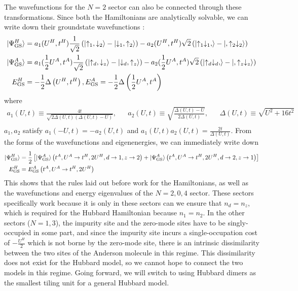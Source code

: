 \documentclass{article}
\numberwithin{equation}{section}
\begin{document}
The wavefunctions for the \(N=2\) sector can also be connected through these transformations. Since both the Hamiltonians are analytically solvable, we can write down their groundstate wavefunctions \cite{pavarini}:
\begin{equation}\begin{aligned}
	\ket{\Psi^H_\text{GS}} &= a_1(U^H, t^H)\frac{1}{\sqrt 2}\left(\ket{\uparrow_1, \downarrow_2} - \ket{\downarrow_1, \uparrow_2}\right) - a_2(U^H,t^H){\sqrt 2}\left(\ket{\uparrow_1\downarrow_1, } - \ket{,\uparrow_2\downarrow_2}\right)\\
	\ket{\Psi^A_\text{GS}} &= a_1(\frac{1}{2}U^A, t^A)\frac{1}{\sqrt 2}\left(\ket{\uparrow_d, \downarrow_z} - \ket{\downarrow_d, \uparrow_z}\right) - a_2(\frac{1}{2}U^A,t^A){\sqrt 2}\left(\ket{\uparrow_d\downarrow_d, } - \ket{,\uparrow_z\downarrow_z}\right)\\
	E^H_\text{GS} &=  -\frac{1}{2}\Delta\left( U^H, t^H \right), E^A_\text{GS} =  -\frac{1}{2}\Delta\left( \frac{1}{2}U^A, t^A \right)
\end{aligned}\end{equation}
where 
\begin{equation}\begin{aligned}
	a_1(U,t) \equiv \frac{4t}{\sqrt{2\Delta(U,t)\left( \Delta(U,t) - U \right) }}, && a_2(U,t) \equiv \sqrt{\frac{\Delta(U,t) - U}{2\Delta(U,t)}}, &&\Delta(U,t) \equiv \sqrt{U^2 + 16t^2}\\
\end{aligned}\end{equation}
$a_1,a_2$ satisfy $a_1(-U,t) = -a_2(U,t)$ and $a_1(U,t)a_2(U,t)= \frac{2t}{\Delta(U,t)}$.
From the forms of the wavefunctions and eigenenergies, we can immediately write down
\begin{equation}\begin{aligned}
	\ket{\Psi^H_\text{GS}} &= \frac{1}{2}\left[\ket{\Psi^A_\text{GS}}\left(t^A, U^A \to t^H, 2U^H, d \to 1, z \to 2\right) + \ket{\Psi^A_\text{GS}}\left(t^A, U^A \to t^H, 2U^H, d \to 2, z \to 1\right)\right]\\
	E^H_\text{GS} &= E^A_\text{GS}\left(t^A, U^A \to t^H, 2U^H\right)
\end{aligned}\end{equation}
This shows that the rules laid out before work for the Hamiltonians, as well as the wavefunctions and energy eigenvalues of the \(N=2,0,4\) sector. These sectors specifically work because it is only in these sectors can we ensure that \(n_d = n_z\), which is required for the Hubbard Hamiltonian because \(n_1 = n_2\). In the other sectors (\(N=1,3\)), the impurity site and the zero-mode sites have to be singly-occupied in some part, and since the impurity site incurs a single-occupation cost of \(-\frac{U^H}{2}\) which is not borne by the zero-mode site, there is an intrinsic dissimilarity between the two sites of the Anderson molecule in this regime. This dissimilarity does not exist for the Hubbard model, so we cannot hope to connect the two models in this regime. Going forward, we will switch to using Hubbard dimers as the smallest tiling unit for a general Hubbard model.
\end{document}
